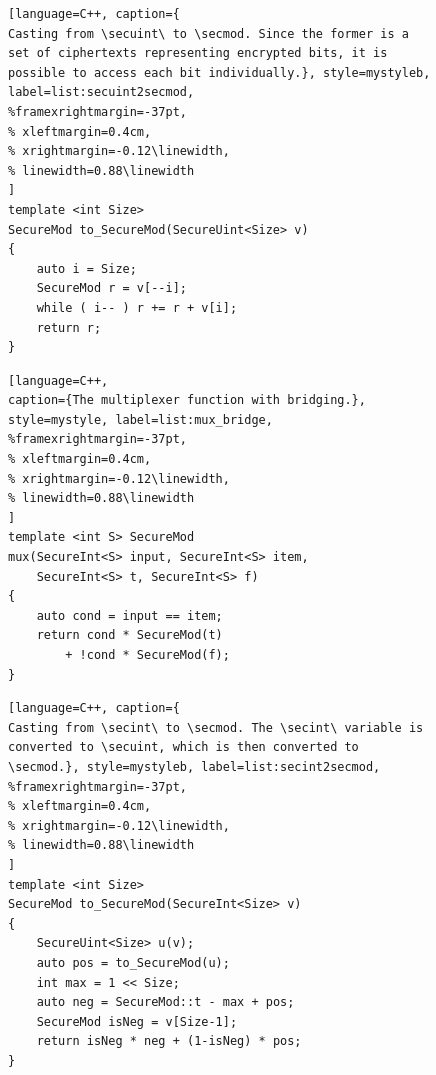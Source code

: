 \begin{figure}[t]
\begin{minipage}{\linewidth}
\begin{lstlisting}[language=C++, caption={
Casting from \secuint\ to \secmod. Since the former is a set of ciphertexts representing encrypted bits, it is possible to access each bit individually.}, style=mystyleb, label=list:secuint2secmod,
%framexrightmargin=-37pt,
% xleftmargin=0.4cm,
% xrightmargin=-0.12\linewidth,
% linewidth=0.88\linewidth
]
template <int Size>
SecureMod to_SecureMod(SecureUint<Size> v)
{
    auto i = Size;
    SecureMod r = v[--i];
    while ( i-- ) r += r + v[i];
    return r;
}
\end{lstlisting}
\end{minipage}
\vspace{-0.5cm} 
\end{figure}

\begin{figure}[t]
\begin{minipage}{\linewidth}
\begin{lstlisting}[language=C++,
caption={The multiplexer function with bridging.},
style=mystyle, label=list:mux_bridge,
%framexrightmargin=-37pt,
% xleftmargin=0.4cm,
% xrightmargin=-0.12\linewidth,
% linewidth=0.88\linewidth
]
template <int S> SecureMod
mux(SecureInt<S> input, SecureInt<S> item,
    SecureInt<S> t, SecureInt<S> f)
{
    auto cond = input == item;
    return cond * SecureMod(t)
        + !cond * SecureMod(f);
}
\end{lstlisting}
\end{minipage}
\end{figure}

\begin{figure}[t]
\begin{minipage}{\linewidth}
\begin{lstlisting}[language=C++, caption={
Casting from \secint\ to \secmod. The \secint\ variable is converted to \secuint, which is then converted to \secmod.}, style=mystyleb, label=list:secint2secmod,
%framexrightmargin=-37pt,
% xleftmargin=0.4cm,
% xrightmargin=-0.12\linewidth,
% linewidth=0.88\linewidth
]
template <int Size>
SecureMod to_SecureMod(SecureInt<Size> v)
{
    SecureUint<Size> u(v);
    auto pos = to_SecureMod(u);
    int max = 1 << Size;
    auto neg = SecureMod::t - max + pos;
    SecureMod isNeg = v[Size-1];
    return isNeg * neg + (1-isNeg) * pos;
}
\end{lstlisting}
\end{minipage}
\vspace{-0.7cm} 
\end{figure}


